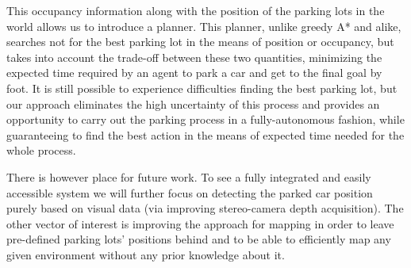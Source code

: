     This occupancy information along with the position of the parking lots in
    the world allows us to introduce a planner. This planner, unlike greedy A*
    and alike, searches not for the best parking lot in the means of position
    or occupancy, but takes into account the trade-off between these two
    quantities, minimizing the expected time required by an agent to park a
    car and get to the final goal by foot. It is still possible to experience
    difficulties finding the best parking lot, but our approach eliminates the
    high uncertainty of this process and provides an opportunity to carry out
    the parking process in a fully-autonomous fashion, while guaranteeing to
    find the best action in the means of expected time needed for the whole
    process.

    There is however place for future work. To see a fully integrated and
    easily accessible system we will further focus on detecting the parked car
    position purely based on visual data (via improving stereo-camera depth
    acquisition). The other vector of interest is improving the approach for
    mapping in order to leave pre-defined parking lots' positions behind and
    to be able to efficiently map any given environment without any prior
    knowledge about it.


